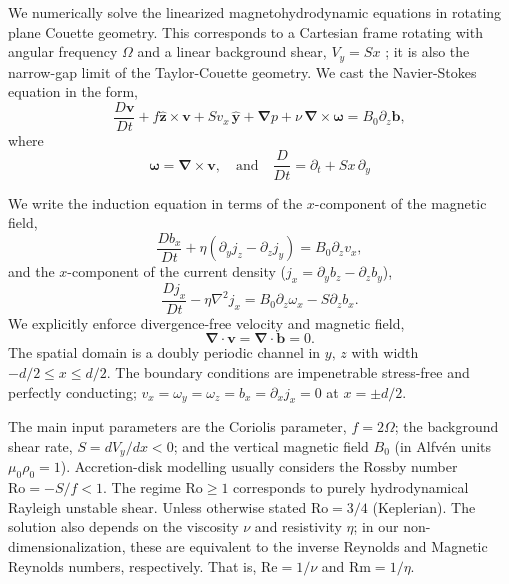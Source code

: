 \documentclass[openacc]{rsproca_new}%
\newcommand{\Reyn}{\mathrm{Re}}
\newcommand{\Reym}{\mathrm{Rm}}
\newcommand{\Ro}{\mathrm{Ro}}
\begin{document}
We numerically solve the linearized magnetohydrodynamic equations in rotating plane Couette geometry.
This corresponds to a Cartesian frame rotating with angular frequency $\Omega$ and a linear background shear, $V_{y}=Sx$ \cite{2015RSPSA.47140699V}; it is also the narrow-gap limit of the Taylor-Couette geometry.
We cast the Navier-Stokes equation in the form,
\begin{equation}\label{eq:mhd}
\frac{D \boldsymbol{v}}{Dt}+f \boldsymbol{\hat{z}}\times\boldsymbol{v}+{S}v_{x}\,\boldsymbol{\hat{y}}+\boldsymbol{\nabla}{p}+\nu\,\boldsymbol{\nabla}\times\boldsymbol{\omega}=B_{0}\partial_{z}\boldsymbol{b},
\end{equation}
where
\begin{equation}
\boldsymbol{\omega}=\boldsymbol{\nabla}\times\boldsymbol{v},\quad\text{and}\quad\frac{D}{Dt}=\partial_{t}+{S}x\,\partial_{y}\end{equation}

We write the induction equation in terms of the $x$-component of the magnetic field,
\begin{equation}\label{eq:Bx}
\frac{Db_{x}}{Dt}+\eta(\partial_{y}j_{z}-\partial_{z}j_{y})=B_{0}\partial_{z}v_{x},
\end{equation}
and the $x$-component of the current density ($j_{x}=\partial_{y}b_{z}-\partial_{z}b_{y}$),
\begin{equation}\label{eq:Jx}
\frac{Dj_{x}}{Dt}-\eta\nabla^{2}j_{x}=B_{0}\partial_{z}\omega_{x}-S\partial_{z}b_{x}.
\end{equation}
We explicitly enforce divergence-free velocity and magnetic field,
\begin{equation}\label{eq:divu}
 \boldsymbol{\nabla}\cdot\boldsymbol{v}=\boldsymbol{\nabla}\cdot\boldsymbol{b}=0.
\end{equation}
The spatial domain is a doubly periodic channel in $y,\,z$ with width $-d/2\le{x}\le d/2$.
The boundary conditions are impenetrable stress-free and perfectly conducting; $v_{x}=\omega_{y}=\omega_{z}=b_{x}=\partial_{x}j_{x}=0$ at $x=\pm{d/2}$. 

The main input parameters are the Coriolis parameter, $f=2 \Omega$; the background shear rate, $S=dV_{y}/dx<0$; and the vertical magnetic field $B_{0}$ (in Alfv\'{e}n units $\mu_{0}\rho_{0}=1$).
Accretion-disk modelling usually considers the Rossby number $\Ro=-S/f<1$. 
The regime $\Ro\ge1$ corresponds to purely hydrodynamical Rayleigh unstable shear.
Unless otherwise stated $\Ro=3/4$ (Keplerian).
The solution also depends on the viscosity $\nu$ and resistivity $\eta$; in our non-dimensionalization, these are equivalent to the inverse Reynolds and Magnetic Reynolds numbers, respectively.
That is, $\Reyn = 1/\nu$ and $\Reym = 1/\eta$.
\end{document}
